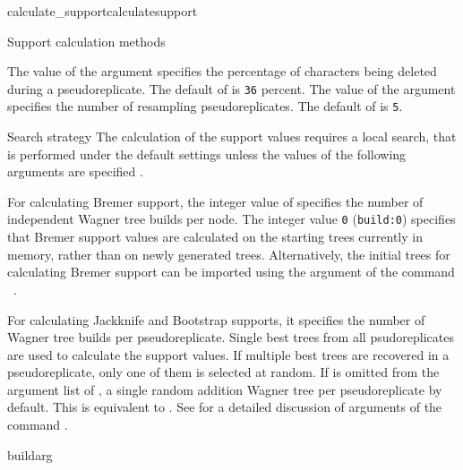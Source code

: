 \begin{command}{calculate\_support}{calculatesupport}
\begin{arguments}
\begin{argumentgroup}{Support calculation methods}
                \begin{description}
                        {The value of the argument  specifies the
                        percentage of characters being deleted during a pseudoreplicate. The
                        default of  is \texttt{36} percent.}
                        {}
                        {The value of the argument  specifies the
                        number of resampling pseudoreplicates. The default of 
                         is \texttt{5}.}
                        {}
               \end{description}  
		\end{argumentgroup}

        \begin{argumentgroup}{Search strategy}
            {The calculation of the support values requires a local search,
            that is performed under the default settings unless the values
            of the following arguments are specified  .}
		 
             {For calculating Bremer support, the integer value of
              specifies the number of independent
             Wagner tree builds per node. The integer value \texttt{0}
             (\texttt{build:0}) specifies that Bremer support values are
             calculated on the starting trees currently
             in memory, rather than on newly generated trees.
             Alternatively, the initial trees for calculating Bremer support
             can be imported using the argument 
             of the command ~.
             
             For calculating Jackknife
             and Bootstrap supports, it specifies the number of
             Wagner tree builds per pseudoreplicate.  Single best trees from all
             psudoreplicates are used to calculate the support values. If
             multiple best trees are recovered in a pseudoreplicate, only one of
             them is selected at random. If  is
             omitted from the argument list of ,
             \poy a single random addition Wagner tree per
             pseudoreplicate by default. This is equivalent to 
             . See
              for a detailed discussion of
             arguments of the command .}
             {buildarg}


\end{argumentgroup}
\end{arguments}
\end{command}
